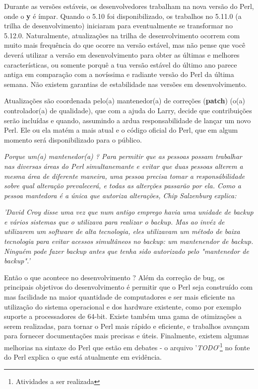 \documentclass[a4paper,12pt,twoside]{book}
\begin{document}
\noindent Durante as versões estáveis, os desenvolvedores trabalham na nova versão do 
Perl, onde o \textbf{y} é ímpar. Quando o 5.10 foi disponibilizado, os trabalhos no 
5.11.0 (a trilha de desenvolvimento) iniciaram para eventualmente se transformar no 
5.12.0. Naturalmente, atualiza\c{c}ões na trilha de desenvolvimento ocorrem com muito 
mais frequência do que ocorre na versão estável, mas não pense que você deverá utilizar 
a versão em desenvolvimento para obter as últimas e melhores características, ou somente 
porquê a tua versão estável do último ano parece antiga em compara\c{c}ão com a novíssima 
e radiante versão do Perl da última semana. Não existem garantias de estabilidade nas 
versões em desenvolvimento.\medskip

\noindent Atualiza\c{c}ões são coordenada pelo(a) mantenedor(a) de corre\c{c}ões (\textbf{patch})
(o(a) controlador(a) de qualidade), que com a ajuda do Larry, decide que contribui\c{c}ões 
serão incluídas e quando, assumindo a ardua responsabilidade de lançar um novo Perl. 
Ele ou ela matém a mais atual e o código oficial do Perl, que em algum momento será 
disponibilizado para o público.\medskip

\noindent \textit{Porque um(a) mantenedor(a) ? Para permitir que as pessoas possam trabalhar 
nas diversas áreas do Perl simultanemante e evitar que duas pessoas alterem a 
mesma área de diferente maneira, uma pessoa precisa tomar a responsábilidade 
sobre qual altera\c{c}ão prevalecerá, e todas as alter\c{c}ões passarão por 
ela. Como a pessoa mantedora é a única que autoriza altera\c{c}ões, Chip 
Salzenburg explica:}\medskip

\noindent \textit{'David Croy disse uma vez que num antigo emprego havia uma 
unidade de backup e vários sistemas que o utilizava para realizar o backup. Mas 
ao invéz de utilizarem um software de alta tecnologia, eles utilizavam um método 
de baixa tecnologia para evitar acessos simultâneos no backup: um mantenendor 
de backup. Ninguém pode fazer backup antes que tenha sido autorizado pelo 
"mantenedor de backup".'}\medskip

\noindent Então o que acontece no desenvolvimento ? Além da corre\c{c}ão de bug, 
os principais objetivos do desenvolvimento é permitir que o Perl seja construído 
com mas facilidade na maior quantidade de computadores e ser mais eficiente na 
utiliza\c{c}ão do sistema operacional e dos hardware existente, como por exemplo 
suporte a processadores de 64-bit. Existe também uma gama de otimiza\c{c}ões a 
serem realizadas, para tornar o Perl mais rápido e eficiente, e trabalhos 
avan\c{c}am para fornecer documentações mais precisas e úteis. Finalmente, 
existem algumas melhorias na sintaxe do Perl que estão em debates - o arquivo 
'\textit{TODO}'\footnote{Atividades a ser realizada} no fonte do Perl explica o que está 
atualmente em evidência.
\end{document}
